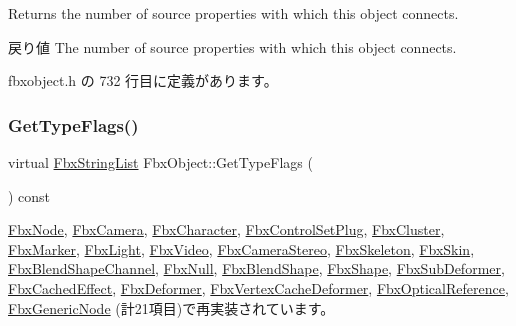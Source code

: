 Returns the number of source properties with which this object connects. \begin{DoxyReturn}{戻り値}
The number of source properties with which this object connects. 
\end{DoxyReturn}


 fbxobject.\+h の 732 行目に定義があります。

\mbox{\label{class_fbx_object_a6d30a5d00400039a248977cf9f9255b2}} 
\subsubsection{\texorpdfstring{Get\+Type\+Flags()}{GetTypeFlags()}}
{\footnotesize\ttfamily virtual \hyperlink{class_fbx_string_list}{Fbx\+String\+List} Fbx\+Object\+::\+Get\+Type\+Flags (\begin{DoxyParamCaption}{ }\end{DoxyParamCaption}) const\hspace{0.3cm}{\ttfamily [virtual]}}



\hyperlink{class_fbx_node_a0356213c5c7afc57a03002db8b002af7}{Fbx\+Node}, \hyperlink{class_fbx_camera_ac52d0e82cbabac69f8b0dcd212853616}{Fbx\+Camera}, \hyperlink{class_fbx_character_ab0b957ac50d562eb146fff27e0f6b937}{Fbx\+Character}, \hyperlink{class_fbx_control_set_plug_a3111172be32f425f4d9b3bf281d2b4d2}{Fbx\+Control\+Set\+Plug}, \hyperlink{class_fbx_cluster_af989ca14bdf9e025f3db49183dc09811}{Fbx\+Cluster}, \hyperlink{class_fbx_marker_aba200b5397b2fe0397e782ea0a602890}{Fbx\+Marker}, \hyperlink{class_fbx_light_a962256338837265748540bd0b3d9b511}{Fbx\+Light}, \hyperlink{class_fbx_video_a69adf09a2346176545e330cd2c8f23ad}{Fbx\+Video}, \hyperlink{class_fbx_camera_stereo_a73c9df71edcd9a56b2710357b95fcde6}{Fbx\+Camera\+Stereo}, \hyperlink{class_fbx_skeleton_a8407f2dbece8af886d80b5a024626d54}{Fbx\+Skeleton}, \hyperlink{class_fbx_skin_a736228a80b5d0db0075527767286be2d}{Fbx\+Skin}, \hyperlink{class_fbx_blend_shape_channel_a354002154ea342025ba0936e656b640a}{Fbx\+Blend\+Shape\+Channel}, \hyperlink{class_fbx_null_a48d35f4f24364e439f0d8a8e07c6d98f}{Fbx\+Null}, \hyperlink{class_fbx_blend_shape_aa2b22b70c929ac1ad39b12f0ade998d1}{Fbx\+Blend\+Shape}, \hyperlink{class_fbx_shape_a36129584616ab648435077244d6e6dbf}{Fbx\+Shape}, \hyperlink{class_fbx_sub_deformer_a80652fd0521b2ea1897e221e5ae1b5cf}{Fbx\+Sub\+Deformer}, \hyperlink{class_fbx_cached_effect_a0702b43325ac99858e85525b3174e921}{Fbx\+Cached\+Effect}, \hyperlink{class_fbx_deformer_ac3f5a3eb2dda62397fc667004d798319}{Fbx\+Deformer}, \hyperlink{class_fbx_vertex_cache_deformer_a67322e24180497b1f268cad5ed29c08b}{Fbx\+Vertex\+Cache\+Deformer}, \hyperlink{class_fbx_optical_reference_ad45da7e49810bea40ff29fdaf0ca9b0b}{Fbx\+Optical\+Reference}, \hyperlink{class_fbx_generic_node_a348566f1d9605e11b70a36cda95c9afb}{Fbx\+Generic\+Node} (計21項目)で再実装されています。

